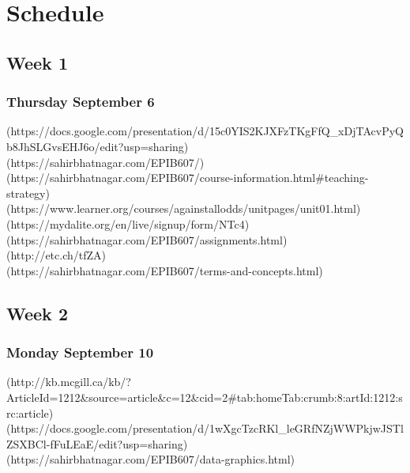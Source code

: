 \documentclass[]{book}
\let\originaltabular\tabular
\let\endoriginaltabular\endtabular
\renewenvironment{tabular}[1]{%
  \begingroup%
  \centering%
  \originaltabular{#1}}%
  {\endoriginaltabular\endgroup}
\theoremstyle{definition}
\theoremstyle{definition}
\theoremstyle{definition}
\theoremstyle{remark}
\begin{document}
\chapter{Schedule}\label{schedule}

\section{Week 1}\label{week-1}

\subsection{Thursday September 6}\label{thursday-september-6}

\begin{table}[H]
\centering
\begin{tabular}{l}
(https://docs.google.com/presentation/d/15c0YIS2KJXFzTKgFfQ\_xDjTAcvPyQb8JhSLGvsEHJ6o/edit?usp=sharing)\\
(https://sahirbhatnagar.com/EPIB607/)\\
(https://sahirbhatnagar.com/EPIB607/course-information.html\#teaching-strategy)\\
(https://www.learner.org/courses/againstallodds/unitpages/unit01.html)\\
(https://mydalite.org/en/live/signup/form/NTc4)\\
(https://sahirbhatnagar.com/EPIB607/assignments.html)\\
(http://etc.ch/tfZA)\\
(https://sahirbhatnagar.com/EPIB607/terms-and-concepts.html)\\
\hline
\end{tabular}
\end{table}

\section{Week 2}\label{week-2}

\subsection{Monday September 10}\label{monday-september-10}

\begin{table}[H]
\centering
\begin{tabular}{l}
(http://kb.mcgill.ca/kb/?ArticleId=1212\&source=article\&c=12\&cid=2\#tab:homeTab:crumb:8:artId:1212:src:article)\\
(https://docs.google.com/presentation/d/1wXgcTzcRKl\_leGRfNZjWWPkjwJSTlZSXBCl-fFuLEaE/edit?usp=sharing)\\
(https://sahirbhatnagar.com/EPIB607/data-graphics.html)\\
\hline
\end{tabular}
\end{table}
\end{document}
